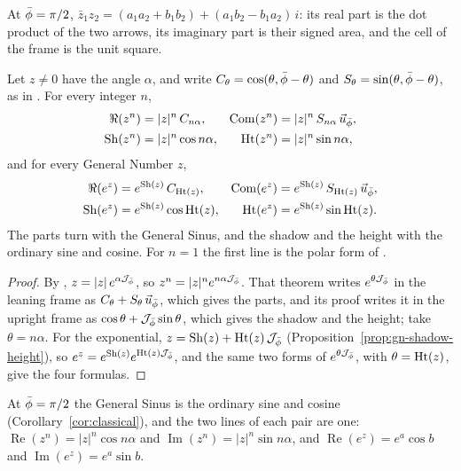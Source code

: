 \incomplex At $\bar{\phi} = \pi/2$, $\bar{z}_1z_2 = (a_1a_2 + b_1b_2) + (a_1b_2 - b_1a_2)\,i$: its real part is the dot product of the two arrows, its imaginary part is their signed area, and the cell of the frame is the unit square.

\begin{corollary}\label{cor:gn-two-trig}
Let $z \neq 0$ have the angle $\alpha$, and write $C_\theta = \cos(\theta, \bar{\phi} - \theta)$ and $S_\theta = \sin(\theta, \bar{\phi} - \theta)$, as in . For every integer $n$,
\begin{align*}
\Re(z^n) &= |z|^n\,C_{n\alpha} , & \operatorname{Com}(z^n) &= |z|^n\,S_{n\alpha}\,\vec{u}_{\bar{\phi}} , \\
\operatorname{Sh}(z^n) &= |z|^n\cos n\alpha , & \operatorname{Ht}(z^n) &= |z|^n\sin n\alpha ,
\end{align*}
and for every General Number $z$,
\begin{align*}
\Re(e^z) &= e^{\operatorname{Sh}(z)}\,C_{\operatorname{Ht}(z)} , & \operatorname{Com}(e^z) &= e^{\operatorname{Sh}(z)}\,S_{\operatorname{Ht}(z)}\,\vec{u}_{\bar{\phi}} , \\
\operatorname{Sh}(e^z) &= e^{\operatorname{Sh}(z)}\cos\operatorname{Ht}(z) , & \operatorname{Ht}(e^z) &= e^{\operatorname{Sh}(z)}\sin\operatorname{Ht}(z) .
\end{align*}
The parts turn with the General Sinus, and the shadow and the height with the ordinary sine and cosine. For $n = 1$ the first line is the polar form of .
\end{corollary}

\begin{proof}
By , $z = |z|\,e^{\alpha\mathcal{J}_{\bar{\phi}}}$, so $z^n = |z|^n e^{n\alpha\mathcal{J}_{\bar{\phi}}}$. That theorem writes $e^{\theta\mathcal{J}_{\bar{\phi}}}$ in the leaning frame as $C_\theta + S_\theta\,\vec{u}_{\bar{\phi}}$, which gives the parts, and its proof writes it in the upright frame as $\cos\theta + \mathcal{J}_{\bar{\phi}}\sin\theta$, which gives the shadow and the height; take $\theta = n\alpha$. For the exponential, $z = \operatorname{Sh}(z) + \operatorname{Ht}(z)\,\mathcal{J}_{\bar{\phi}}$ (Proposition~\ref{prop:gn-shadow-height}), so $e^z = e^{\operatorname{Sh}(z)}e^{\operatorname{Ht}(z)\mathcal{J}_{\bar{\phi}}}$, and the same two forms of $e^{\theta\mathcal{J}_{\bar{\phi}}}$, with $\theta = \operatorname{Ht}(z)$, give the four formulas.
\end{proof}

\incomplex At $\bar{\phi} = \pi/2$ the General Sinus is the ordinary sine and cosine (Corollary~\ref{cor:classical}), and the two lines of each pair are one: $\operatorname{Re}(z^n) = |z|^n\cos n\alpha$ and $\operatorname{Im}(z^n) = |z|^n\sin n\alpha$, and $\operatorname{Re}(e^z) = e^a\cos b$ and $\operatorname{Im}(e^z) = e^a\sin b$.

